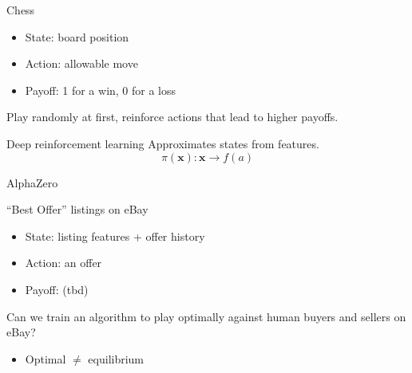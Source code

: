 \documentclass[aspectratio=169]{beamer}
\begin{document}
\begin{frame}{Chess}
	\begin{itemize}
		\item State: board position
		\item Action: allowable move
		\item Payoff: 1 for a win, 0 for a loss
	\end{itemize}
	\vspace{5mm}
	Play randomly at first, reinforce actions that lead to higher payoffs.
\end{frame}

\begin{frame}{Deep reinforcement learning}
	Approximates states from features.
	$$\pi(\boldsymbol{x}): \boldsymbol{x} \rightarrow f(a)$$
\end{frame}

\begin{frame}{AlphaZero}

\end{frame}

\begin{frame}{``Best Offer'' listings on eBay}
	\begin{itemize}
		\item State: listing features + offer history
		\item Action: an offer
		\item Payoff: (tbd)
	\end{itemize}
	\vspace{5mm}
	Can we train an algorithm to play optimally against human buyers and sellers on eBay?\pause
	\begin{itemize}
		\item Optimal $\neq$ equilibrium
	\end{itemize}
\end{frame}

\end{document}
